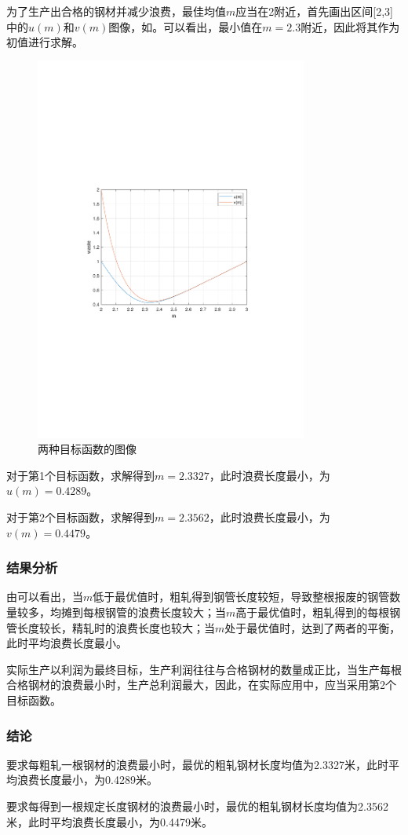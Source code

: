 为了生产出合格的钢材并减少浪费，最佳均值$m$应当在2附近，首先画出区间[2,3]中的$u(m)$和$v(m)$图像，如。可以看出，最小值在$m=2.3$附近，因此将其作为初值进行求解。

\begin{figure}[H]
    \centering
    \includegraphics[width=0.8\textwidth,trim={3.09cm 9.295cm 3.09cm 9.295cm},clip]{fig/ex9_waste.pdf}
    \caption{两种目标函数的图像}
    \label{fig:ex9_waste}
\end{figure}

对于第1个目标函数，求解得到$m=2.3327$，此时浪费长度最小，为$u(m)=0.4289$。

对于第2个目标函数，求解得到$m=2.3562$，此时浪费长度最小，为$v(m)=0.4479$。

\subsubsection{结果分析}

由可以看出，当$m$低于最优值时，粗轧得到钢管长度较短，导致整根报废的钢管数量较多，均摊到每根钢管的浪费长度较大；当$m$高于最优值时，粗轧得到的每根钢管长度较长，精轧时的浪费长度也较大；当$m$处于最优值时，达到了两者的平衡，此时平均浪费长度最小。

实际生产以利润为最终目标，生产利润往往与合格钢材的数量成正比，当生产每根合格钢材的浪费最小时，生产总利润最大，因此，在实际应用中，应当采用第2个目标函数。

\subsubsection{结论}

要求每粗轧一根钢材的浪费最小时，最优的粗轧钢材长度均值为2.3327米，此时平均浪费长度最小，为0.4289米。

要求每得到一根规定长度钢材的浪费最小时，最优的粗轧钢材长度均值为2.3562米，此时平均浪费长度最小，为0.4479米。
